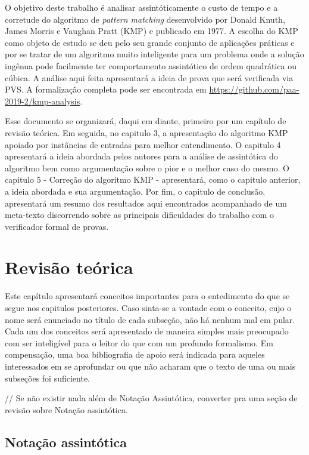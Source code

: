 \documentclass[12pt]{article}
\begin{document}
O objetivo deste trabalho é analisar assintóticamente o custo de tempo e a corretude do algoritmo de \textit{pattern matching}
desenvolvido por Donald Knuth, James Morris e Vaughan Pratt (KMP) e publicado em 1977. A escolha do KMP como objeto de estudo se deu pelo seu grande conjunto
de aplicações práticas e por se tratar de um algoritmo muito inteligente para um problema onde a solução ingênua pode facilmente ter comportamento assintótico
de ordem quadrática ou cúbica. A análise aqui feita apresentará a ideia de prova que será verificada via PVS. 
A formalização completa pode ser encontrada em \url{https://github.com/paa-2019-2/kmp-analysis}.

Esse documento se organizará, daqui em diante, primeiro por um capítulo de revisão teórica. Em seguida, no capitulo 3, a apresentação do algoritmo KMP
apoiado por instâncias de entradas para melhor entendimento. O capitulo 4 apresentará a ideia abordada pelos autores para a análise de assintótica do algoritmo
bem como argumentação sobre o pior e o melhor caso do mesmo. O capitulo 5 - Correção do algoritmo KMP - apresentará, como o capitulo anterior, a ideia abordada
e sua argumentação. Por fim, o capitulo de conclusão, apresentará um resumo dos resultados aqui encontrados acompanhado de um meta-texto discorrendo sobre
as principais dificuldades do trabalho com o verificador formal de provas.

\section{Revisão teórica}

Este capítulo apresentará conceitos importantes para o entedimento do que se segue nos capitulos posteriores. Caso sinta-se a vontade com o conceito, 
cujo o nome será enunciado no título de cada subseção, não há nenhum mal em pular. Cada um dos conceitos será apresentado de maneira simples mais preocupado
com ser inteligível para o leitor do que com um profundo formalismo. Em compensação, uma boa bibliografia de apoio será indicada para aqueles interessados em 
se aprofundar ou que não acharam que o texto de uma ou mais subseções foi suficiente.

// Se não existir nada além de Notação Assintótica, converter pra uma seção de revisão sobre Notação assintótica.
\subsection{Notação assintótica}
\end{document}
